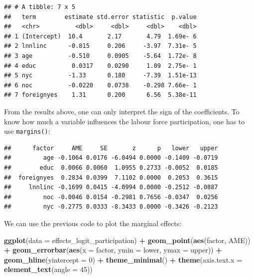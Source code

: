 \documentclass[]{gitbook}
\newenvironment{Shaded}{\begin{snugshade}}{\end{snugshade}}
\newcommand{\DataTypeTok}[1]{\textcolor[rgb]{0.13,0.29,0.53}{#1}}
\newcommand{\DecValTok}[1]{\textcolor[rgb]{0.00,0.00,0.81}{#1}}
\newcommand{\KeywordTok}[1]{\textcolor[rgb]{0.13,0.29,0.53}{\textbf{#1}}}
\newcommand{\NormalTok}[1]{#1}
\newcommand{\OperatorTok}[1]{\textcolor[rgb]{0.81,0.36,0.00}{\textbf{#1}}}
\newcommand{\StringTok}[1]{\textcolor[rgb]{0.31,0.60,0.02}{#1}}
\theoremstyle{definition}
\theoremstyle{definition}
\theoremstyle{definition}
\theoremstyle{remark}
\begin{document}
\begin{verbatim}
## # A tibble: 7 x 5
##   term        estimate std.error statistic  p.value
##   <chr>          <dbl>     <dbl>     <dbl>    <dbl>
## 1 (Intercept)  10.4       2.17       4.79  1.69e- 6
## 2 lnnlinc      -0.815     0.206     -3.97  7.31e- 5
## 3 age          -0.510     0.0905    -5.64  1.72e- 8
## 4 educ          0.0317    0.0290     1.09  2.75e- 1
## 5 nyc          -1.33      0.180     -7.39  1.51e-13
## 6 noc          -0.0220    0.0738    -0.298 7.66e- 1
## 7 foreignyes    1.31      0.200      6.56  5.38e-11
\end{verbatim}

From the results above, one can only interpret the sign of the
coefficients. To know how much a variable influences the labour force
participation, one has to use \texttt{margins()}:

\begin{Shaded}
\end{Shaded}

\begin{verbatim}
##      factor     AME     SE       z      p   lower   upper
##         age -0.1064 0.0176 -6.0494 0.0000 -0.1409 -0.0719
##        educ  0.0066 0.0060  1.0955 0.2733 -0.0052  0.0185
##  foreignyes  0.2834 0.0399  7.1102 0.0000  0.2053  0.3615
##     lnnlinc -0.1699 0.0415 -4.0994 0.0000 -0.2512 -0.0887
##         noc -0.0046 0.0154 -0.2981 0.7656 -0.0347  0.0256
##         nyc -0.2775 0.0333 -8.3433 0.0000 -0.3426 -0.2123
\end{verbatim}

We can use the previous code to plot the marginal effects:

\begin{Shaded}
\begin{Highlighting}[]
\KeywordTok{ggplot}\NormalTok{(}\DataTypeTok{data =}\NormalTok{ effects_logit_participation) }\OperatorTok{+}
\StringTok{  }\KeywordTok{geom_point}\NormalTok{(}\KeywordTok{aes}\NormalTok{(factor, AME)) }\OperatorTok{+}
\StringTok{  }\KeywordTok{geom_errorbar}\NormalTok{(}\KeywordTok{aes}\NormalTok{(}\DataTypeTok{x =}\NormalTok{ factor, }\DataTypeTok{ymin =}\NormalTok{ lower, }\DataTypeTok{ymax =}\NormalTok{ upper)) }\OperatorTok{+}
\StringTok{  }\KeywordTok{geom_hline}\NormalTok{(}\DataTypeTok{yintercept =} \DecValTok{0}\NormalTok{) }\OperatorTok{+}
\StringTok{  }\KeywordTok{theme_minimal}\NormalTok{() }\OperatorTok{+}
\StringTok{  }\KeywordTok{theme}\NormalTok{(}\DataTypeTok{axis.text.x =} \KeywordTok{element_text}\NormalTok{(}\DataTypeTok{angle =} \DecValTok{45}\NormalTok{))}
\end{Highlighting}
\end{Shaded}
\end{document}
